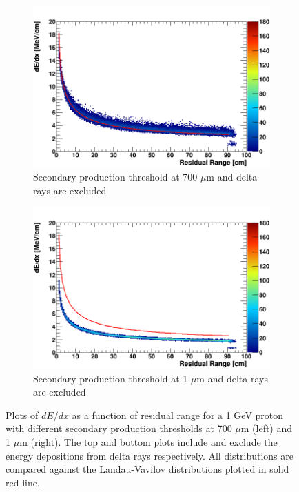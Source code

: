 \begin{figure}[tbp!]
\begin{subfigure}[b]{0.495\textwidth}
            \centering 
            \includegraphics[width=\textwidth]{derr_proton_only_700um}
            \caption{Secondary production threshold at 700 $\mu$m and delta rays are excluded}%
            \label{fig:derr_proton_only_700}
        \end{subfigure}
        \hfill
        \begin{subfigure}[b]{0.495\textwidth}   
            \centering 
            \includegraphics[width=\textwidth]{derr_proton_only_1um}
            \caption{Secondary production threshold at 1 $\mu$m and delta rays are excluded}%
            \label{fig:derr_proton_only_1}
        \end{subfigure}
        \caption{
	Plots of $dE/dx$ as a function of residual range for a 1 GeV proton with different secondary production thresholds at 700 $\mu$m (left) and 1 $\mu$m (right). 
	The top and bottom plots include and exclude the energy depositions from delta rays respectively. 
	All distributions are compared against the Landau-Vavilov distributions plotted in solid red line.
	}
        \label{fig:proton_derr}
\end{figure}

